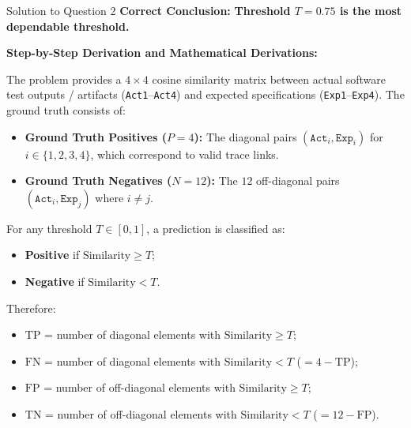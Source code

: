 \documentclass[11pt,a4paper]{article}
\begin{document}
\begin{solutionbox}{Solution to Question 2}
\textbf{Correct Conclusion:} \textbf{Threshold $T = 0.75$ is the most dependable threshold.}

\medskip
\textbf{Step-by-Step Derivation and Mathematical Derivations:}

The problem provides a $4 \times 4$ cosine similarity matrix between actual software test outputs / artifacts (\texttt{Act1}--\texttt{Act4}) and expected specifications (\texttt{Exp1}--\texttt{Exp4}).
The ground truth consists of:
\begin{itemize}
    \item \textbf{Ground Truth Positives ($P = 4$):} The diagonal pairs $(\texttt{Act}_i, \texttt{Exp}_i)$ for $i \in \{1, 2, 3, 4\}$, which correspond to valid trace links.
    \item \textbf{Ground Truth Negatives ($N = 12$):} The $12$ off-diagonal pairs $(\texttt{Act}_i, \texttt{Exp}_j)$ where $i \neq j$.
\end{itemize}

For any threshold $T \in [0, 1]$, a prediction is classified as:
\begin{itemize}[noitemsep]
    \item \textbf{Positive} if $\text{Similarity} \ge T$;
    \item \textbf{Negative} if $\text{Similarity} < T$.
\end{itemize}
Therefore:
\begin{itemize}[noitemsep]
    \item $\text{TP}$ = number of diagonal elements with $\text{Similarity} \ge T$;
    \item $\text{FN}$ = number of diagonal elements with $\text{Similarity} < T$ ($= 4 - \text{TP}$);
    \item $\text{FP}$ = number of off-diagonal elements with $\text{Similarity} \ge T$;
    \item $\text{TN}$ = number of off-diagonal elements with $\text{Similarity} < T$ ($= 12 - \text{FP}$).
\end{itemize}


\end{solutionbox}
\end{document}
